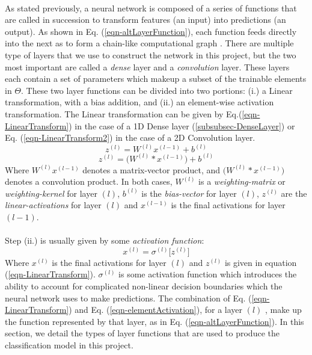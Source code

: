 \documentclass[12pt,letterpaper]{article}
\begin{document}
\paragraph*{}As stated previously, a neural network is composed of a series of functions that are called in succession to transform features (an input) into predictions (an output). As shown in Eq. (\ref{eqn-altLayerFunction}), each function feeds directly into the next as to form a chain-like computational graph \cite{Goodfellow}. There are multiple type of layers that we use to construct the network in this project, but the two most important are called a \textit{dense} layer and a \textit{convolution} layer. These layers each contain a set of parameters which makeup a subset of the trainable elements in $\Theta$.
These two layer functions can be divided into two portions: (i.) a Linear transformation, with a bias addition, and (ii.) an element-wise activation transformation. The Linear transformation can be given by Eq.(\ref{eqn-LinearTransform}) in the case of a 1D Dense layer (\ref{subsubsec-DenseLayer}) or Eq. (\ref{eqn-LinearTransform2}) in the case of a 2D Convolution layer.
\begin{equation}
\label{eqn-LinearTransform}
z^{(l)} = W^{(l)} x^{(l-1)} + b^{(l)}
\end{equation}
\begin{equation}
\label{eqn-LinearTransform2}
z^{(l)} = \big(W^{(l)} * x^{(l-1)}\big) + b^{(l)}
\end{equation} 
Where $W^{(l)} x^{(l-1)}$ denotes a matrix-vector product, and $\big(W^{(l)} * x^{(l-1)}\big)$ denotes a convolution product. In both cases, $W^{(l)}$ is a \textit{weighting-matrix} or \textit{weighting-kernel} for layer $(l)$, $b^{(l)}$ is the \textit{bias-vector} for layer $(l)$, $z^{(l)}$ are the \textit{linear-activations} for layer $(l)$ and $x^{(l-1)}$ is the final activations for layer $(l-1)$.

\paragraph*{}Step (ii.) is usually given by some \textit{activation function}:
\begin{equation}
\label{eqn-elementActivation}
x^{(l)} = \sigma^{(l)} \big[ z^{(l)} \big]
\end{equation}
Where $x^{(l)}$ is the final activations for layer $(l)$ and $z^{(l)}$ is given in equation (\ref{eqn-LinearTransform}). $\sigma^{(l)}$ is some activation function which introduces the ability to account for complicated non-linear decision boundaries which the neural network uses to make predictions. The combination of Eq. (\ref{eqn-LinearTransform}) and Eq. (\ref{eqn-elementActivation}), for a layer $(l)$ , make up the function represented by that layer, as in Eq. (\ref{eqn-altLayerFunction}). In this section, we detail the types of layer functions that are used to produce the classification model in this project.
\end{document}

